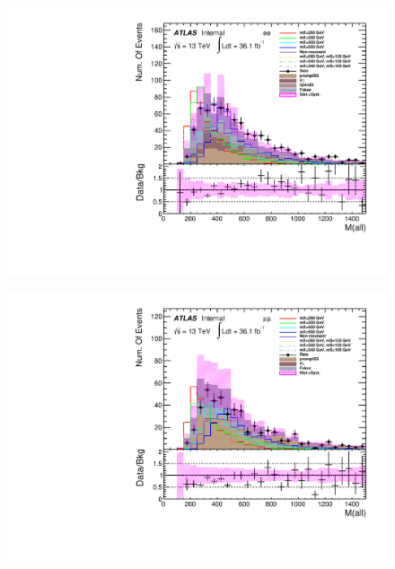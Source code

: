 \begin{figure}[h]
\begin{minipage}[t]{0.33\linewidth}
 \includegraphics[width=1.0\textwidth,angle=-90]{fig/dataMC_low_Njet_CR/m_all_ee.pdf}\label{fig:dataMC_low_Njet_CR:m_all_ee.pdf}
 \end{minipage}
  \begin{minipage}[t]{0.33\linewidth}
 \centering
 \includegraphics[width=1.0\textwidth,angle=-90]{fig/dataMC_low_Njet_CR/m_all_mumu.pdf}\label{fig:dataMC_low_Njet_CR:m_all_mumu.pdf}
 \end{minipage}
 \begin{minipage}[t]{0.33\linewidth}
 \centering

\end{minipage}
\end{figure}

